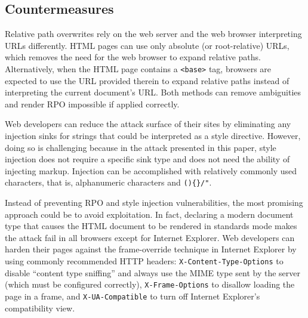 \subsection{Countermeasures}
\label{rpo:sec:mitigation}

Relative path overwrites rely on the web server and the web browser interpreting
URLs differently. HTML pages can use only absolute (or root-relative) URLs,
which removes the need for the web browser to expand relative paths.
Alternatively, when the HTML page contains a \texttt{<base>} tag, browsers are
expected to use the URL provided therein to expand relative paths instead of
interpreting the current document's URL. Both methods can remove ambiguities and
render RPO impossible if applied correctly.

Web developers can reduce the attack surface of their sites by eliminating any
injection sinks for strings that could be interpreted as a style directive.
However, doing so is challenging because in the attack presented in this paper,
style injection does not require a specific sink type and does not need the
ability of injecting markup. Injection can be accomplished with relatively
commonly used characters, that is, alphanumeric characters and
\texttt{()\{\}/"}.

Instead of preventing RPO and style injection vulnerabilities, the most
promising approach could be to avoid exploitation. In fact, declaring a modern
document type that causes the HTML document to be rendered in standards mode
makes the attack fail in all browsers except for Internet Explorer. Web
developers can harden their pages against the frame-override technique in
Internet Explorer by using commonly recommended HTTP headers:
\texttt{X-Content-Type-Options} to disable ``content type sniffing'' and always
use the MIME type sent by the server (which must be configured correctly),
\texttt{X-Frame-Options} to disallow loading the page in a frame, and
\texttt{X-UA-Compatible} to turn off Internet Explorer's compatibility view.
